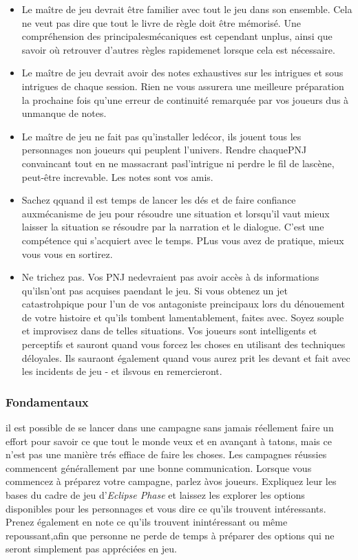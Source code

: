 {\begin{itemize} \item Le maître de jeu devrait être familier avec tout le jeu dans son ensemble. Cela ne veut pas dire que tout le livre de règle doit être mémorisé. Une compréhension des principalesmécaniques est cependant unplus, ainsi que savoir où retrouver d'autres règles rapidemenet lorsque cela est nécessaire. \item Le maître de jeu devrait avoir des notes exhaustives sur les intrigues et sous intrigues de chaque session. Rien ne vous assurera une meilleure préparation la prochaine fois qu'une erreur de continuité remarquée par vos joueurs dus à unmanque de notes. \item Le maître de jeu ne fait pas qu'installer ledécor, ils jouent tous les personnages non joueurs qui peuplent l'univers. Rendre chaquePNJ convaincant tout en ne massacrant pasl'intrigue ni perdre le fil de lascène, peut-être increvable. Les notes sont vos amis. \item Sachez qquand il est temps de lancer les dés et de faire confiance auxmécanisme de jeu pour résoudre une situation et lorsqu'il vaut mieux laisser la situation se résoudre par la narration et le dialogue. C'est une compétence qui s'acquiert avec le temps. PLus vous avez de pratique, mieux vous vous en sortirez. \item Ne trichez pas. Vos PNJ nedevraient pas avoir accès à ds informations qu'ilsn'ont pas acquises paendant le jeu. Si vous obtenez un jet catastrohpique pour l'un de vos antagoniste preincipaux lors du dénouement de votre histoire et qu'ils tombent lamentablement, faites avec. Soyez souple et improvisez dans de telles situations. Vos joueurs sont intelligents et perceptifs et sauront quand vous forcez les choses en utilisant des techniques déloyales. Ils sauraont également quand vous aurez prit les devant et fait avec les incidents de jeu - et ilsvous en remercieront. \end{itemize} 

\subsubsection{Fondamentaux} 

il est possible de se lancer dans une campagne sans jamais réellement faire un effort pour savoir ce que tout le monde veux et en avançant à tatons, mais ce n'est pas une manière trés effiace de faire les choses. Les campagnes réussies commencent générallement par une bonne communication. Lorsque vous commencez à préparez votre campagne, parlez àvos joueurs. Expliquez leur les bases du cadre de jeu d'\textit{Eclipse Phase} et laissez les explorer les options disponibles pour les personnages et vous dire ce qu'ils trouvent intéressants. Prenez également en note ce qu'ils trouvent inintéressant ou même repoussant,afin que personne ne perde de temps à préparer des options qui ne seront simplement pas appréciées en jeu. 

}
